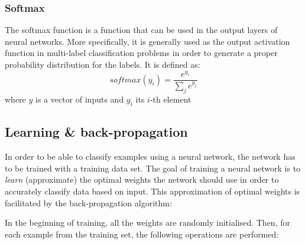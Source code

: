 \subsubsection{Softmax}
\label{sec:softmax}
The softmax function is a function that can be used in the output layers of neural networks. More specifically, it is generally used as the output activation function in multi-label classification problems in order to generate a proper probability distribution for the labels. It is defined as:
\begin{equation*}
    softmax(y_i) = \frac{e^{y_i}}{\sum_{j} e^{y_j}}
\end{equation*}
where $y$ is a vector of inputs and $y_i$ its $i$-th element

\subsection{Learning \& back-propagation}
In order to be able to classify examples using a neural network, the network has to be trained with a training data set. The goal of training a neural network is to \textit{learn} (approximate) the optimal weights the network should use in order to accurately classify data based on input. This approximation of optimal weights is facilitated by the back-propagation algorithm:
\medskip
\par
In the beginning of training, all the weights are randomly initialised. Then, for each example from the training set, the following operations are performed:
